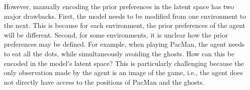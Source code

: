 \documentclass[twoside,11pt]{article}
\begin{document}
However, manually encoding the prior preferences in the latent space has two major drawbacks. First, the model needs to be modified from one environment to the next. This is because for each environment, the prior preferences of the agent will be different. Second, for some environments, it is unclear how the prior preferences may be defined. For example, when playing PacMan, the agent needs to eat all the dots, while simultaneously avoiding the ghosts. How can this be encoded in the model's latent space? This is particularly challenging because the only observation made by the agent is an image of the game, i.e., the agent does not directly have access to the positions of PacMan and the ghosts. 


\begin{figure}[H]
	\begin{center}
\end{center}
\end{figure}
\end{document}
